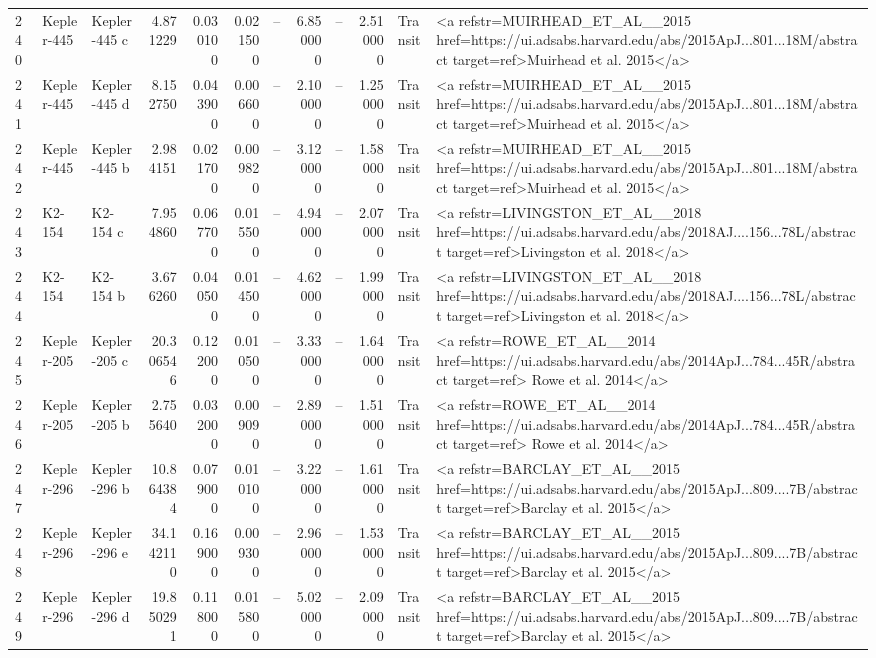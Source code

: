 \begin{tabular}{lllrrrrrrrll}
240 & Kepler-445 & Kepler-445 c & 4.871229 & 0.030100 & 0.021500 & -- & 6.850000 & -- & 2.510000 & Transit & <a refstr=MUIRHEAD_ET_AL__2015 href=https://ui.adsabs.harvard.edu/abs/2015ApJ...801...18M/abstract target=ref>Muirhead et al. 2015</a> \\
241 & Kepler-445 & Kepler-445 d & 8.152750 & 0.043900 & 0.006600 & -- & 2.100000 & -- & 1.250000 & Transit & <a refstr=MUIRHEAD_ET_AL__2015 href=https://ui.adsabs.harvard.edu/abs/2015ApJ...801...18M/abstract target=ref>Muirhead et al. 2015</a> \\
242 & Kepler-445 & Kepler-445 b & 2.984151 & 0.021700 & 0.009820 & -- & 3.120000 & -- & 1.580000 & Transit & <a refstr=MUIRHEAD_ET_AL__2015 href=https://ui.adsabs.harvard.edu/abs/2015ApJ...801...18M/abstract target=ref>Muirhead et al. 2015</a> \\
243 & K2-154 & K2-154 c & 7.954860 & 0.067700 & 0.015500 & -- & 4.940000 & -- & 2.070000 & Transit & <a refstr=LIVINGSTON_ET_AL__2018 href=https://ui.adsabs.harvard.edu/abs/2018AJ....156...78L/abstract target=ref>Livingston et al. 2018</a> \\
244 & K2-154 & K2-154 b & 3.676260 & 0.040500 & 0.014500 & -- & 4.620000 & -- & 1.990000 & Transit & <a refstr=LIVINGSTON_ET_AL__2018 href=https://ui.adsabs.harvard.edu/abs/2018AJ....156...78L/abstract target=ref>Livingston et al. 2018</a> \\
245 & Kepler-205 & Kepler-205 c & 20.306546 & 0.122000 & 0.010500 & -- & 3.330000 & -- & 1.640000 & Transit & <a refstr=ROWE_ET_AL__2014 href=https://ui.adsabs.harvard.edu/abs/2014ApJ...784...45R/abstract target=ref> Rowe et al. 2014</a> \\
246 & Kepler-205 & Kepler-205 b & 2.755640 & 0.032000 & 0.009090 & -- & 2.890000 & -- & 1.510000 & Transit & <a refstr=ROWE_ET_AL__2014 href=https://ui.adsabs.harvard.edu/abs/2014ApJ...784...45R/abstract target=ref> Rowe et al. 2014</a> \\
247 & Kepler-296 & Kepler-296 b & 10.864384 & 0.079000 & 0.010100 & -- & 3.220000 & -- & 1.610000 & Transit & <a refstr=BARCLAY_ET_AL__2015 href=https://ui.adsabs.harvard.edu/abs/2015ApJ...809....7B/abstract target=ref>Barclay et al. 2015</a> \\
248 & Kepler-296 & Kepler-296 e & 34.142110 & 0.169000 & 0.009300 & -- & 2.960000 & -- & 1.530000 & Transit & <a refstr=BARCLAY_ET_AL__2015 href=https://ui.adsabs.harvard.edu/abs/2015ApJ...809....7B/abstract target=ref>Barclay et al. 2015</a> \\
249 & Kepler-296 & Kepler-296 d & 19.850291 & 0.118000 & 0.015800 & -- & 5.020000 & -- & 2.090000 & Transit & <a refstr=BARCLAY_ET_AL__2015 href=https://ui.adsabs.harvard.edu/abs/2015ApJ...809....7B/abstract target=ref>Barclay et al. 2015</a> \\

\end{tabular}
